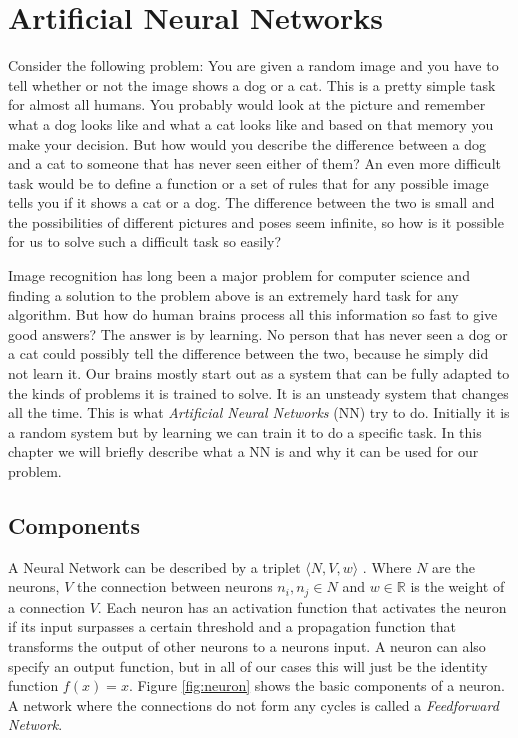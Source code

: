 \section{Artificial Neural Networks}
\label{section:NN}
Consider the following problem: You are given a random image and you have to tell whether or not the image shows a dog or a cat.
This is a pretty simple task for almost all humans.
You probably would look at the picture and remember what a dog looks like and what a cat looks like and based on that memory you make your decision.
But how would you describe the difference between a dog and a cat to someone that has never seen either of them?
An even more difficult task would be to define a function or a set of rules that for any possible image tells you if it shows a cat or a dog.
The difference between the two is small and the possibilities of different pictures and poses seem infinite, so how is it possible for us to solve such a difficult task so easily?


Image recognition has long been a major problem for computer science and finding a solution to the problem above is an extremely hard task for any algorithm.
But how do human brains process all this information so fast to give good answers? The answer is by learning.
No person that has never seen a dog or a cat could possibly tell the difference between the two, because he simply did not learn it.
Our brains mostly start out as a system that can be fully adapted to the kinds of problems it is trained to solve.
It is an unsteady system that changes all the time.
This is what \emph{Artificial Neural Networks} (NN) try to do. Initially it is a random system but by learning we can train it to do a specific task.
In this chapter we will briefly describe what a NN is and why it can be used for our problem.

\subsection{Components}

A Neural Network can be described by a triplet $\langle N, V, w \rangle$ \cite{neuralnets}. Where $N$ are the neurons, $V$ the connection between neurons $n_i, n_j \in N$ and $w \in \mathbb{R}$ is the weight of a connection $V$.
Each neuron has an activation function that activates the neuron if its input surpasses a certain threshold and a propagation function that transforms the output of other neurons to a neurons input.
A neuron can also specify an output function, but in all of our cases this will just be the identity function $f(x) = x$.
Figure \ref{fig:neuron} shows the basic components of a neuron.
A network where the connections do not form any cycles is called a \emph{Feedforward Network}.


